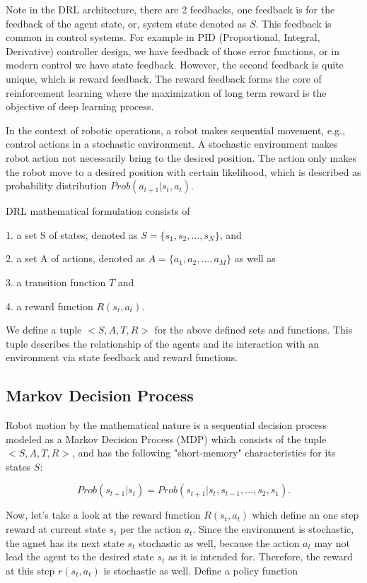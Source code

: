 \documentclass[conference]{IEEEtran}
\begin{document}
Note in the DRL architecture, there are 2 feedbacks, one feedback
is for the feedback of the agent state, or, system state 
denoted as ${S}$. This feedback is common in control systems. 
For example in PID (Proportional, Integral, Derivative) controller
design, we have feedback of those error functions,
or in modern control we have 
state feedback. However, the second feedback is quite 
unique, which is reward feedback. The reward feedback 
forms the core of reinforcement learning where the 
maximization of long term reward is the objective of 
deep learning process. 

In the context of robotic operations, 
a robot makes 
sequential movement, e.g., control actions in a stochastic 
environment. A stochastic environment makes 
robot action not necessarily bring to the desired 
position. The action only makes the robot move to 
a desired position with certain likelihood, which is 
described as probability distribution
$Prob(a_{t+1}|s_t,a_t)$. 

DRL mathematical formulation consists of 

1. a set S of states, denoted as 
$S = \{s_1, s_2, ..., s_N \}$, 
and 

2. a set A of actions, denoted as 
$A = \{a_1, a_2, ..., a_M \}$ 
as well as  

3. a transition function
$T$ and 

4. a reward function $R(s_t, a_t)$. 

We define   
a tuple $< S, A, T, R >$ for the above defined sets and 
functions. This tuple describes the relationship of 
the agents and its
interaction with an environment via state feedback
and reward functions. 

\subsection{Markov Decision Process}

Robot motion by the mathematical nature is a 
sequential decision process modeled as 
a Markov Decision Process (MDP) which consists of 
the tuple $< S, A, T, R >$, and has the following 
"short-memory" characteristics for its states $S$: 

\begin{equation}
Prob(s_{t+1}|s_t) = Prob(s_{t+1}|s_t, s_{t-1}, ..., s_2, s_1) . 
\end{equation}

Now, let's take a look at the reward function
$R(s_t, a_t)$ which define an one step reward 
at current state $s_t$ per the action $a_t$. 
Since the environment is stochastic, the agnet has its
next state $s_t$ stochastic as well, because the 
action $a_t$ may not lead the agent to the 
desired state $s_t$ as it is intended for. 
Therefore, the reward at this step
$r(s_t, a_t)$ is stochastic as well. 
Define a policy function 
\end{document}
